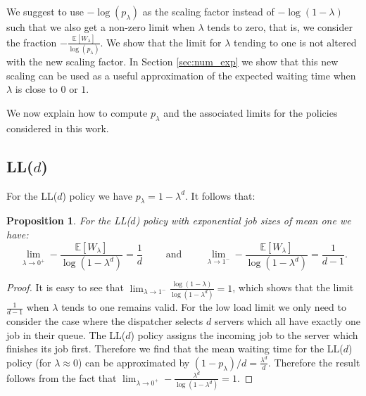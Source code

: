 \documentclass[12pt]{report}
\newcommand{\E}{\mathbb{E}}
\newtheorem{proposition}[theorem]{Proposition}
\begin{document}
We suggest to use $-\log(p_\lambda)$ as the scaling factor instead of $-\log (1-\lambda)$
such that we also get a non-zero limit when $\lambda$ tends to zero, that is, we consider the fraction $-\frac{\E[W_\lambda]}{\log(p_\lambda)}$. We show that the limit 
for $\lambda$ tending to one is not altered with the new scaling factor. In Section \ref{sec:num_exp} we show that this new scaling can be used as a useful approximation of the expected waiting time when $\lambda$ is close to $0$ or $1$.

We now explain how to compute $p_\lambda$ and the associated limits for the policies considered in this work.
\subsection{LL($d$)}
For the LL($d$) policy we have $p_\lambda = 1-\lambda^d$. It follows that:
\begin{proposition} \label{prop:bounds_LLd}
For the LL($d$) policy with exponential job sizes of mean one we have:
\begin{equation}
\lim_{\lambda\rightarrow 0^+} -\frac{\E[W_\lambda]}{\log(1-\lambda^d)} = \frac{1}{d} \qquad \mbox{ and } \qquad \lim_{\lambda\rightarrow 1^-} -\frac{\E[W_\lambda]}{\log(1-\lambda^d)} = \frac{1}{d-1}.
\end{equation}
\end{proposition}
\begin{proof}
It is easy to see that $\lim_{\lambda \rightarrow 1^-} \frac{\log(1-\lambda)}{\log(1-\lambda^d)} = 1$, which shows that the limit $\frac{1}{d-1}$ when $\lambda$ tends to one  remains valid. For the low load limit we only need to consider the case where the dispatcher selects $d$ servers which all have exactly one job in their queue. The LL($d$) policy assigns the incoming job to the server which finishes its job first. Therefore we find that the mean waiting time for the LL($d$) policy (for $\lambda \approx 0$) can be approximated by $(1-p_\lambda)/d = \frac{\lambda^d}{d}$. Therefore the result follows from the fact that $\lim_{\lambda \rightarrow 0^+} - \frac{\lambda^d}{\log(1-\lambda^d)} = 1$.
\end{proof}
\end{document}
